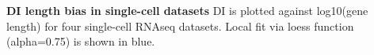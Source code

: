 \textbf{DI length bias in single-cell datasets} DI is plotted against log10(gene length) for four single-cell RNAseq datasets. Local fit via loess function (alpha=0.75) is shown in blue.

